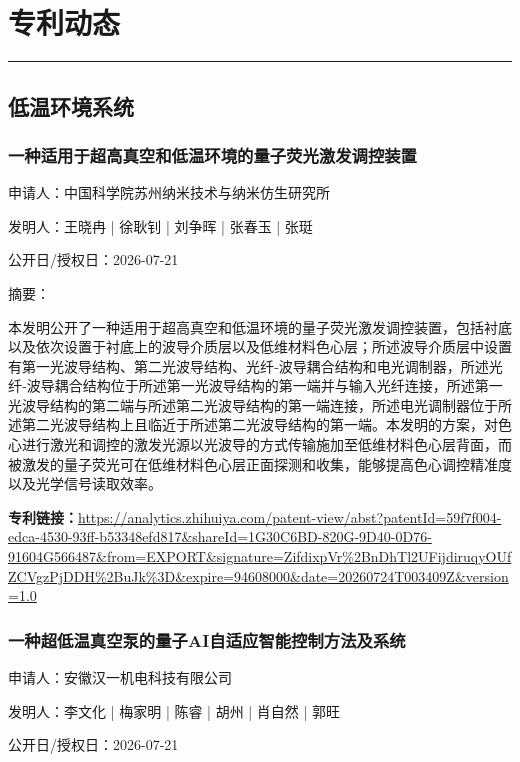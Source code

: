\documentclass[12pt,a4paper]{ctexart}
\begin{document}
\newpage
\section{专利动态}
\vspace{-0.5em}
\noindent\rule{\linewidth}{1.5pt}

\subsection{ 低温环境系统 }

\subsubsection{ 一种适用于超高真空和低温环境的量子荧光激发调控装置 }

申请人：中国科学院苏州纳米技术与纳米仿生研究所

发明人：王晓冉 | 徐耿钊 | 刘争晖 | 张春玉 | 张珽

公开日/授权日：2026-07-21

摘要：

本发明公开了一种适用于超高真空和低温环境的量子荧光激发调控装置，包括衬底以及依次设置于衬底上的波导介质层以及低维材料色心层；所述波导介质层中设置有第一光波导结构、第二光波导结构、光纤‑波导耦合结构和电光调制器，所述光纤‑波导耦合结构位于所述第一光波导结构的第一端并与输入光纤连接，所述第一光波导结构的第二端与所述第二光波导结构的第一端连接，所述电光调制器位于所述第二光波导结构上且临近于所述第二光波导结构的第一端。本发明的方案，对色心进行激光和调控的激发光源以光波导的方式传输施加至低维材料色心层背面，而被激发的量子荧光可在低维材料色心层正面探测和收集，能够提高色心调控精准度以及光学信号读取效率。

\noindent\textbf{专利链接：}\url{https://analytics.zhihuiya.com/patent-view/abst?patentId=59f7f004-edca-4530-93ff-b53348efd817&shareId=1G30C6BD-820G-9D40-0D76-91604G566487&from=EXPORT&signature=ZifdixpVr%2BnDhTl2UFijdiruqyOUfZCVgzPjDDH%2BuJk%3D&expire=94608000&date=20260724T003409Z&version=1.0}

\subsubsection{ 一种超低温真空泵的量子AI自适应智能控制方法及系统 }

申请人：安徽汉一机电科技有限公司

发明人：李文化 | 梅家明 | 陈睿 | 胡州 | 肖自然 | 郭旺

公开日/授权日：2026-07-21
\end{document}

